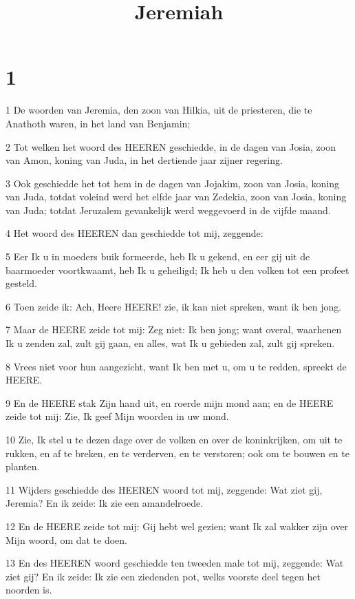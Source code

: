 

\title{Jeremiah}



\chapter{1}

\par 1 De woorden van Jeremia, den zoon van Hilkia, uit de priesteren, die te Anathoth waren, in het land van Benjamin;
\par 2 Tot welken het woord des HEEREN geschiedde, in de dagen van Josia, zoon van Amon, koning van Juda, in het dertiende jaar zijner regering.
\par 3 Ook geschiedde het tot hem in de dagen van Jojakim, zoon van Josia, koning van Juda, totdat voleind werd het elfde jaar van Zedekia, zoon van Josia, koning van Juda; totdat Jeruzalem gevankelijk werd weggevoerd in de vijfde maand.
\par 4 Het woord des HEEREN dan geschiedde tot mij, zeggende:
\par 5 Eer Ik u in moeders buik formeerde, heb Ik u gekend, en eer gij uit de baarmoeder voortkwaamt, heb Ik u geheiligd; Ik heb u den volken tot een profeet gesteld.
\par 6 Toen zeide ik: Ach, Heere HEERE! zie, ik kan niet spreken, want ik ben jong.
\par 7 Maar de HEERE zeide tot mij: Zeg niet: Ik ben jong; want overal, waarhenen Ik u zenden zal, zult gij gaan, en alles, wat Ik u gebieden zal, zult gij spreken.
\par 8 Vrees niet voor hun aangezicht, want Ik ben met u, om u te redden, spreekt de HEERE.
\par 9 En de HEERE stak Zijn hand uit, en roerde mijn mond aan; en de HEERE zeide tot mij: Zie, Ik geef Mijn woorden in uw mond.
\par 10 Zie, Ik stel u te dezen dage over de volken en over de koninkrijken, om uit te rukken, en af te breken, en te verderven, en te verstoren; ook om te bouwen en te planten.
\par 11 Wijders geschiedde des HEEREN woord tot mij, zeggende: Wat ziet gij, Jeremia? En ik zeide: Ik zie een amandelroede.
\par 12 En de HEERE zeide tot mij: Gij hebt wel gezien; want Ik zal wakker zijn over Mijn woord, om dat te doen.
\par 13 En des HEEREN woord geschiedde ten tweeden male tot mij, zeggende: Wat ziet gij? En ik zeide: Ik zie een ziedenden pot, welks voorste deel tegen het noorden is.
